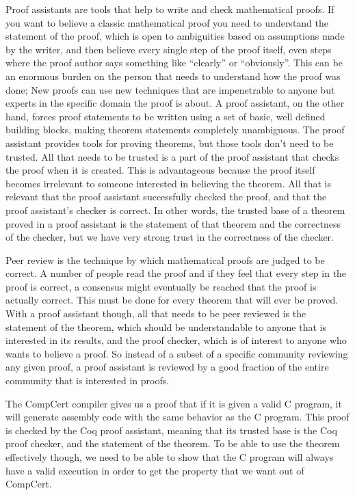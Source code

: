 \documentclass{puthesis}
\begin{document}
Proof assistants are tools that help to write and check mathematical
proofs. If you want to believe a classic mathematical proof you need
to understand the statement of the proof, which is open to ambiguities
based on assumptions made by the writer, and then believe every single
step of the proof itself, even steps where the proof author says
something like ``clearly'' or ``obviously''. This can be an enormous
burden on the person that needs to understand how the proof was done;
New proofs can use new techniques that are impenetrable to anyone but
experts in the specific domain the proof is about. A proof assistant,
on the other hand, forces proof statements to be written using a set
of basic, well defined building blocks, making theorem statements
completely unambiguous. The proof assistant provides tools for proving
theorems, but those tools don't need to be trusted. All that needs to
be trusted is a part of the proof assistant that checks the proof when
it is created. This is advantageous because the proof itself becomes
irrelevant to someone interested in believing the theorem. All that is
relevant that the proof assistant successfully checked the proof, and
that the proof assistant's checker is correct. In other words, the
trusted base of a theorem proved in a proof assistant is the statement
of that theorem and the correctness of the checker, but we have very
strong trust in the correctness of the checker.

Peer review is the technique by which mathematical proofs are judged
to be correct. A number of people read the proof and if they feel that
every step in the proof is correct, a consensus might eventually be
reached that the proof is actually correct. This must be done for
every theorem that will ever be proved. With a proof assistant though,
all that needs to be peer reviewed is the statement of the theorem,
which should be understandable to anyone that is interested in its
results, and the proof checker, which is of interest to anyone who
wants to believe a proof. So instead of a subset of a specific
community reviewing any given proof, a proof assistant is reviewed by
a good fraction of the entire community that is interested in proofs.

The CompCert compiler gives us a proof that if it is given a valid C
program, it will generate assembly code with the same behavior as the
C program. This proof is checked by the Coq proof assistant, meaning
that its trusted base is the Coq proof checker, and the statement of
the theorem. To be able to use the theorem effectively though, we need
to be able to show that the C program will always have a valid
execution in order to get the property that we want out of CompCert.
\end{document}
